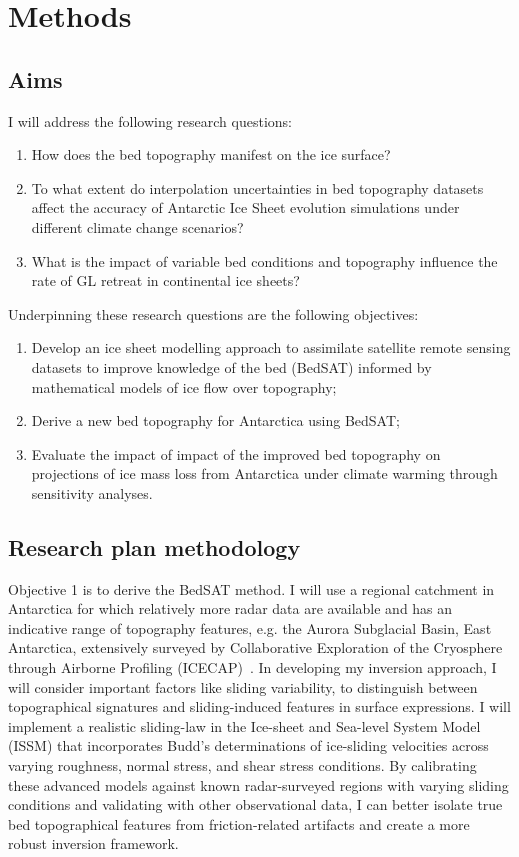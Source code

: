 \chapter{Methods}
\section{Aims}

I will address the following research questions:
\begin{enumerate}

    \item How does the bed topography manifest on the ice surface?

    \item To what extent do interpolation uncertainties in bed topography datasets affect the accuracy of Antarctic Ice Sheet evolution simulations under different climate change scenarios?

    \item What is the impact of variable bed conditions and topography influence the rate of GL retreat in continental ice sheets?

\end{enumerate}
Underpinning these research questions are the following objectives:
\begin{enumerate}
    \item Develop an ice sheet modelling approach to assimilate satellite remote sensing datasets to improve knowledge of the bed (BedSAT) informed by mathematical models of ice flow over topography;
    \item Derive a new bed topography for Antarctica using BedSAT;
    \item Evaluate the impact of impact of the improved bed topography on projections of ice mass loss from Antarctica under climate warming through sensitivity analyses. 
\end{enumerate}

\section{Research plan methodology}

Objective 1 is to derive the BedSAT method. I will use a regional catchment in Antarctica for which relatively more radar data are available and has an indicative range of topography features, e.g. the Aurora Subglacial Basin, East Antarctica, extensively surveyed by Collaborative Exploration of the Cryosphere through Airborne Profiling (ICECAP)~\cite{Young_2011}. In developing my inversion approach, I will consider important factors like sliding variability, to distinguish between topographical signatures and sliding-induced features in surface expressions. I will implement a realistic sliding-law in the Ice-sheet and Sea-level System Model (ISSM) that incorporates Budd's  determinations of ice-sliding velocities across varying roughness, normal stress, and shear stress conditions. By calibrating these advanced models against known radar-surveyed regions with varying sliding conditions and validating with other observational data, I can better isolate true bed topographical features from friction-related artifacts and create a more robust inversion framework.

